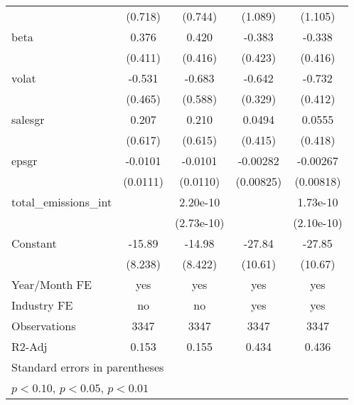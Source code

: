\begin{table}[htbp]
\begin{tabular}{l*{4}{c}}
                    &     (0.718)         &     (0.744)         &     (1.089)         &     (1.105)         \\
[1em]
beta                &       0.376         &       0.420         &      -0.383         &      -0.338         \\
                    &     (0.411)         &     (0.416)         &     (0.423)         &     (0.416)         \\
[1em]
volat               &      -0.531         &      -0.683         &      -0.642\sym{*}  &      -0.732\sym{*}  \\
                    &     (0.465)         &     (0.588)         &     (0.329)         &     (0.412)         \\
[1em]
salesgr             &       0.207         &       0.210         &      0.0494         &      0.0555         \\
                    &     (0.617)         &     (0.615)         &     (0.415)         &     (0.418)         \\
[1em]
epsgr               &     -0.0101         &     -0.0101         &    -0.00282         &    -0.00267         \\
                    &    (0.0111)         &    (0.0110)         &   (0.00825)         &   (0.00818)         \\
[1em]
total\_emissions\_int &                     &    2.20e-10         &                     &    1.73e-10         \\
                    &                     &  (2.73e-10)         &                     &  (2.10e-10)         \\
[1em]
Constant            &      -15.89\sym{*}  &      -14.98\sym{*}  &      -27.84\sym{**} &      -27.85\sym{**} \\
                    &     (8.238)         &     (8.422)         &     (10.61)         &     (10.67)         \\
\hline
Year/Month FE       &         yes         &         yes         &         yes         &         yes         \\
Industry FE         &          no         &          no         &         yes         &         yes         \\
Observations        &        3347         &        3347         &        3347         &        3347         \\
R2-Adj              &       0.153         &       0.155         &       0.434         &       0.436         \\
\hline\hline
\multicolumn{5}{l}{\footnotesize Standard errors in parentheses}\\
\multicolumn{5}{l}{\footnotesize \sym{*} \(p<0.10\), \sym{**} \(p<0.05\), \sym{***} \(p<0.01\)}\\
\end{tabular}
\end{table}
